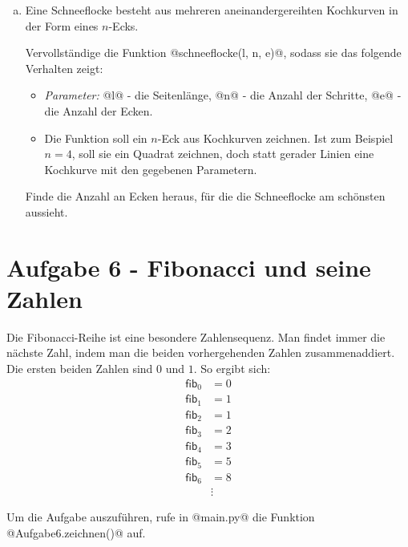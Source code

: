 \begin{enumerate}[(a)]
        \item
        Eine Schneeflocke besteht aus mehreren aneinandergereihten Kochkurven in der Form eines $n$-Ecks. 
        
        Vervollständige die Funktion @schneeflocke(l, n, e)@, sodass sie das folgende Verhalten zeigt:
        \begin{itemize}
            \item 
            \textit{Parameter:} @l@ - die Seitenlänge, @n@ - die Anzahl der Schritte, @e@ - die Anzahl der Ecken.
            \item
            Die Funktion soll ein $n$-Eck aus Kochkurven zeichnen. Ist zum Beispiel $n=4$, soll sie ein Quadrat zeichnen, 
            doch statt gerader Linien eine Kochkurve mit den gegebenen Parametern.				
        \end{itemize}
        
        Finde die Anzahl an Ecken heraus, für die die Schneeflocke am schönsten aussieht.
        


    \end{enumerate}
    
    \section*{Aufgabe 6 - Fibonacci und seine Zahlen}
    Die Fibonacci-Reihe ist eine besondere Zahlensequenz. Man findet immer die nächste Zahl, indem man die beiden vorhergehenden Zahlen zusammenaddiert. 
    Die ersten beiden Zahlen sind $0$ und $1$. So ergibt sich:
    \begin{align*}
        \mathsf{fib}_0 &= 0 \\
        \mathsf{fib}_1 &= 1 \\
        \mathsf{fib}_2 &= 1 \\
        \mathsf{fib}_3 &= 2 \\
        \mathsf{fib}_4 &= 3 \\
        \mathsf{fib}_5 &= 5 \\
        \mathsf{fib}_6 &= 8 \\
        &\vdots 
    \end{align*}   
    
    Um die Aufgabe auszuführen, rufe in @main.py@ die Funktion @Aufgabe6.zeichnen()@ auf.
    
